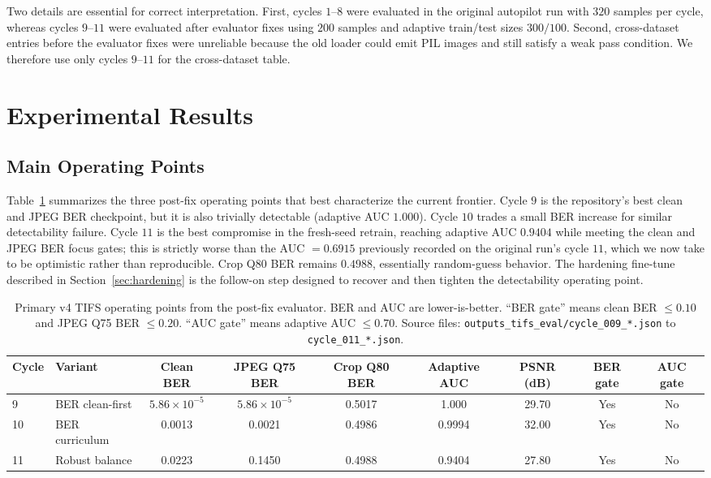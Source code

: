 \documentclass[journal]{IEEEtran}
\begin{document}
Two details are essential for correct interpretation. First, cycles $1$--$8$ were evaluated in the original autopilot run with $320$ samples per cycle, whereas cycles $9$--$11$ were evaluated after evaluator fixes using $200$ samples and adaptive train/test sizes $300/100$. Second, cross-dataset entries before the evaluator fixes were unreliable because the old loader could emit PIL images and still satisfy a weak pass condition. We therefore use only cycles $9$--$11$ for the cross-dataset table.

\section{Experimental Results}
\subsection{Main Operating Points}
Table~\ref{tab:main_results} summarizes the three post-fix operating points that best characterize the current frontier. Cycle $9$ is the repository's best clean and JPEG BER checkpoint, but it is also trivially detectable (adaptive AUC $1.000$). Cycle $10$ trades a small BER increase for similar detectability failure. Cycle $11$ is the best compromise in the fresh-seed retrain, reaching adaptive AUC $0.9404$ while meeting the clean and JPEG BER focus gates; this is strictly worse than the AUC $=0.6915$ previously recorded on the original run's cycle $11$, which we now take to be optimistic rather than reproducible. Crop Q80 BER remains $0.4988$, essentially random-guess behavior. The hardening fine-tune described in Section~\ref{sec:hardening} is the follow-on step designed to recover and then tighten the detectability operating point.

\begin{table}[t]
\centering
\caption{Primary v4 TIFS operating points from the post-fix evaluator. BER and AUC are lower-is-better. ``BER gate'' means clean BER $\leq 0.10$ and JPEG Q75 BER $\leq 0.20$. ``AUC gate'' means adaptive AUC $\leq 0.70$. Source files: \texttt{outputs\_tifs\_eval/cycle\_009\_*.json} to \texttt{cycle\_011\_*.json}.}
\label{tab:main_results}
\small
\begin{tabular}{l l c c c c c c c}
\toprule
Cycle & Variant & Clean BER & JPEG Q75 BER & Crop Q80 BER & Adaptive AUC & PSNR (dB) & BER gate & AUC gate \\
\midrule
9 & BER clean-first & $5.86\times10^{-5}$ & $5.86\times10^{-5}$ & 0.5017 & 1.000 & 29.70 & Yes & No \\
10 & BER curriculum & 0.0013 & 0.0021 & 0.4986 & 0.9994 & 32.00 & Yes & No \\
11 & Robust balance & 0.0223 & 0.1450 & 0.4988 & 0.9404 & 27.80 & Yes & No \\
\bottomrule
\end{tabular}
\end{table}
\end{document}
